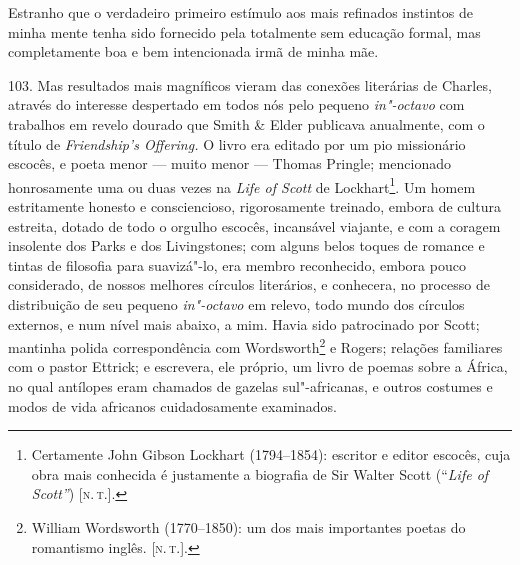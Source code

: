 Estranho que o verdadeiro primeiro estímulo aos mais refinados instintos
de minha mente tenha sido fornecido pela totalmente sem educação formal,
mas completamente boa e bem intencionada irmã de minha mãe.

103. Mas resultados mais magníficos vieram das conexões literárias de
Charles, através do interesse despertado em todos nós pelo pequeno
\emph{in"-octavo} com trabalhos em revelo dourado que Smith \& Elder
publicava anualmente, com o título de \emph{Friendship's Offering.} O
livro era editado por um pio missionário escocês, e poeta menor --- muito
menor --- Thomas Pringle; mencionado honrosamente uma ou duas vezes na
\emph{Life of Scott} de Lockhart\footnote{Certamente John Gibson
  Lockhart (1794--1854): escritor e editor escocês, cuja obra mais
  conhecida é justamente a biografia de Sir Walter Scott (``\emph{Life
  of Scott''}) {[}\textsc{n.\,t.}{]}.}. Um homem estritamente honesto e
consciencioso, rigorosamente treinado, embora de cultura estreita,
dotado de todo o orgulho escocês, incansável viajante, e com a coragem
insolente dos Parks e dos Livingstones; com alguns belos toques de
romance e tintas de filosofia para suavizá"-lo, era membro reconhecido,
embora pouco considerado, de nossos melhores círculos literários, e
conhecera, no processo de distribuição de seu pequeno \emph{in"-octavo}
em relevo, todo mundo dos círculos externos, e num nível mais abaixo, a
mim. Havia sido patrocinado por Scott; mantinha polida correspondência
com Wordsworth\footnote{William Wordsworth (1770--1850): um dos mais
  importantes poetas do romantismo inglês. {[}\textsc{n.\,t.}{]}.} e Rogers;
relações familiares com o pastor Ettrick; e escrevera, ele próprio, um
livro de poemas sobre a África, no qual antílopes eram chamados de
gazelas sul"-africanas, e outros costumes e modos de vida africanos
cuidadosamente examinados.

